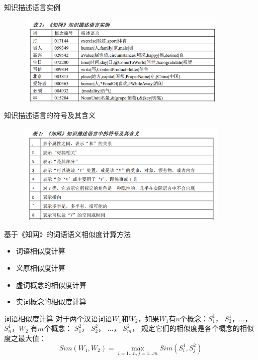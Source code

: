 \documentclass{beamer}
\begin{document}
    \begin{frame}{知识描述语言实例}
      \begin{figure}
      \includegraphics[width=4in,height=1.7in]{hownet1.png}
      \end{figure}
    \end{frame}

    \begin{frame}{知识描述语言的符号及其含义}
      \begin{figure}
      \includegraphics[width=4in,height=1.92in]{hownet3.png}
      \end{figure}
    \end{frame}

    \begin{frame}{基于《知网》的词语语义相似度计算方法}
      \begin{itemize}
        \item 词语相似度计算
        \item 义原相似度计算
        \item 虚词概念的相似度计算
        \item 实词概念的相似度计算
      \end{itemize}
    \end{frame}

    \begin{frame}{词语相似度计算}
      对于两个汉语词语$W_1$和$W_2$，如果$W_1$有$n$个概念：$S_1^1$， $S_2^1$，...， $S_n^1$，$W_2$ 有$m$个概念： $S_1^2$， $S_2^2$， ...， $S_m^2$， 规定它们的相似度是各个概念的相似度之最大值：
      \begin{equation}
        Sim(W_1, W_2) = \max_{i=1...n, j=1...m}{Sim(S_i^1, S_j^2)}
      \end{equation}
    \end{frame}
\end{document}

